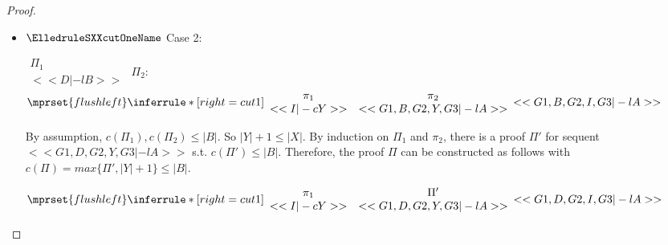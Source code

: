 \begin{proof}
\begin{enumerate}
\begin{itemize}
    \item $\ElledruleSXXcutOneName$ Case 2:
      \begin{center}
        \scriptsize
        \begin{math}
          \begin{array}{c}
            \Pi_1 \\
            {<<D |-l B>>}
          \end{array}
        \end{math}
        \qquad\qquad
        $\Pi_2$:
        \begin{math}
          $$\mprset{flushleft}
          \inferrule* [right={\tiny cut1}] {
            {
              \begin{array}{cc}
                \pi_1 & \pi_2 \\
                {<<I |-c Y>>} & {<<G1, B, G2, Y, G3 |-l A>>}
              \end{array}
            }
          }{<<G1, B, G2, I, G3 |-l A>>}
        \end{math}
      \end{center}
      By assumption, $c(\Pi_1),c(\Pi_2)\leq |B|$. So $|Y|+1 \leq |X|$. By induction on $\Pi_1$
      and $\pi_2$, there is a proof $\Pi'$ for sequent $<<G1, D, G2, Y, G3 |-l A>>$ s.t.
      $c(\Pi') \leq |B|$. Therefore, the proof $\Pi$ can be constructed as follows with
      $c(\Pi) = max\{\Pi', |Y|+1\} \leq |B|$.
      \begin{center}
        \scriptsize
        \begin{math}
          $$\mprset{flushleft}
          \inferrule* [right={\tiny cut1}] {
            {
              \begin{array}{cc}
                \pi_1 & \Pi' \\
                {<<I |-c Y>>} & {<<G1, D, G2, Y, G3 |-l A>>}
              \end{array}
            }
          }{<<G1, D, G2, I, G3 |-l A>>}
        \end{math}
      \end{center}


\end{itemize}
\end{enumerate}
\end{proof}
